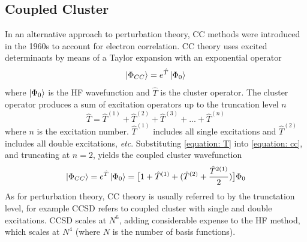 \subsection{Coupled Cluster}\label{section: CC}
In an alternative approach to perturbation theory, \ac{CC} methods were introduced in the 1960s to account for electron correlation.\cite{Cizek1966,Paldus1972} \ac{CC} theory uses excited determinants by means of a Taylor expansion with an exponential operator
\begin{equation}\label{equation: cc}
    \ket{\Phi_{CC}}=e^{\hat{T}}\ket{\Phi_{0}}
\end{equation}
where $\ket{\Phi_{0}}$ is the \ac{HF} wavefunction and $\hat{T}$ is the cluster operator. The cluster operator produces a sum of excitation operators up to the truncation level $n$
\begin{equation}\label{equation: T}
    \hat{T}=\hat{T}^{(1)}+\hat{T}^{(2)}+\hat{T}^{(3)}+...+\hat{T}^{(n)}
\end{equation}
where $n$ is the excitation number. $\hat{T}^{(1)}$ includes all single excitations and $\hat{T}^{(2)}$ includes all double excitations, \textit{etc}.
Substituting \ref{equation: T} into \ref{equation: cc}, and truncating at $n=2$, yields the coupled cluster wavefunction
\begin{equation}\label{equation: CCwavefunctioncomplete}
\ket{\Phi_{CC}}=e^{\hat{T}}\ket{\Phi_{0}}=\big[1+\hat{T}^{(1)}+(\hat{T}^{(2)}+\frac{\hat{T}^{2(1)}}{2})\big]\Phi_{0}
\end{equation}
As for perturbation theory, \ac{CC} theory is usually referred to by the trunctation level, for example CCSD refers to coupled cluster with single and double excitations. CCSD scales at $N^{6}$, adding considerable expense to the \ac{HF} method, which scales at $N^{4}$ (where $N$ is the number of basis functions).


